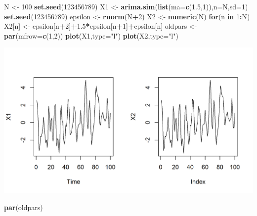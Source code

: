 \documentclass[]{article}
\newenvironment{Shaded}{\begin{snugshade}}{\end{snugshade}}
\newcommand{\KeywordTok}[1]{\textcolor[rgb]{0.13,0.29,0.53}{\textbf{#1}}}
\newcommand{\DataTypeTok}[1]{\textcolor[rgb]{0.13,0.29,0.53}{#1}}
\newcommand{\DecValTok}[1]{\textcolor[rgb]{0.00,0.00,0.81}{#1}}
\newcommand{\FloatTok}[1]{\textcolor[rgb]{0.00,0.00,0.81}{#1}}
\newcommand{\StringTok}[1]{\textcolor[rgb]{0.31,0.60,0.02}{#1}}
\newcommand{\ControlFlowTok}[1]{\textcolor[rgb]{0.13,0.29,0.53}{\textbf{#1}}}
\newcommand{\OperatorTok}[1]{\textcolor[rgb]{0.81,0.36,0.00}{\textbf{#1}}}
\newcommand{\NormalTok}[1]{#1}
\begin{document}
\begin{Shaded}
\begin{Highlighting}[]
\NormalTok{N <-}\StringTok{ }\DecValTok{100}
\KeywordTok{set.seed}\NormalTok{(}\DecValTok{123456789}\NormalTok{)}
\NormalTok{X1 <-}\StringTok{ }\KeywordTok{arima.sim}\NormalTok{(}\KeywordTok{list}\NormalTok{(}\DataTypeTok{ma=}\KeywordTok{c}\NormalTok{(}\FloatTok{1.5}\NormalTok{,}\DecValTok{1}\NormalTok{)),}\DataTypeTok{n=}\NormalTok{N,}\DataTypeTok{sd=}\DecValTok{1}\NormalTok{)}
\KeywordTok{set.seed}\NormalTok{(}\DecValTok{123456789}\NormalTok{)}
\NormalTok{epsilon <-}\StringTok{ }\KeywordTok{rnorm}\NormalTok{(N}\OperatorTok{+}\DecValTok{2}\NormalTok{)}
\NormalTok{X2 <-}\StringTok{ }\KeywordTok{numeric}\NormalTok{(N)}
\ControlFlowTok{for}\NormalTok{(n }\ControlFlowTok{in} \DecValTok{1}\OperatorTok{:}\NormalTok{N) X2[n] <-}\StringTok{ }\NormalTok{epsilon[n}\OperatorTok{+}\DecValTok{2}\NormalTok{]}\OperatorTok{+}\FloatTok{1.5}\OperatorTok{*}\NormalTok{epsilon[n}\OperatorTok{+}\DecValTok{1}\NormalTok{]}\OperatorTok{+}\NormalTok{epsilon[n]}
\NormalTok{oldpars <-}\StringTok{ }\KeywordTok{par}\NormalTok{(}\DataTypeTok{mfrow=}\KeywordTok{c}\NormalTok{(}\DecValTok{1}\NormalTok{,}\DecValTok{2}\NormalTok{))}
\KeywordTok{plot}\NormalTok{(X1,}\DataTypeTok{type=}\StringTok{"l"}\NormalTok{)}
\KeywordTok{plot}\NormalTok{(X2,}\DataTypeTok{type=}\StringTok{"l"}\NormalTok{)}
\end{Highlighting}
\end{Shaded}
\includegraphics{figure/intro-ma_sim-1.png}

\begin{Shaded}
\begin{Highlighting}[]
\KeywordTok{par}\NormalTok{(oldpars)}
\end{Highlighting}
\end{Shaded}
\end{document}
